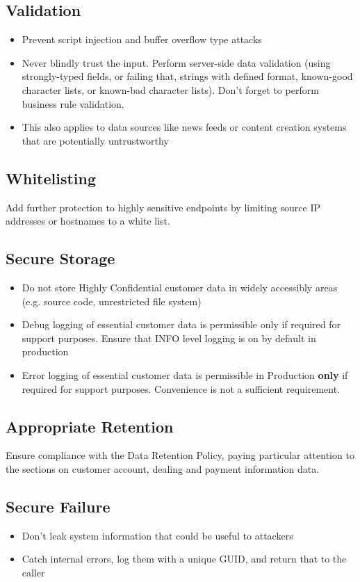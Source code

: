 \documentclass[a5paper,pagesize,10pt,bibtotoc,DIV=10,twoside]{scrbook}
\begin{document}
\subsection{Validation}
\begin{itemize}
\item Prevent script injection and buffer overflow type attacks
\item Never blindly trust the input. Perform server-side data validation (using strongly-typed fields, or failing that, strings with defined format, known-good character lists, or known-bad character lists). Don't forget to perform business rule validation.
\item This also applies to data sources like news feeds or content creation systems that are potentially untrustworthy
\end{itemize}

\subsection{Whitelisting}
Add further protection to highly sensitive endpoints by limiting source IP addresses or hostnames to a white list.

\subsection{Secure Storage}
\begin{itemize}
\item Do not store Highly Confidential customer data in widely accessibly areas (e.g. source code, unrestricted file system)
\item Debug logging of essential customer data is permissible only if required for support purposes.  Ensure that INFO level logging is on by default in production
\item Error logging of essential customer data is permissible in Production \textbf{only} if required for support purposes. Convenience is not a sufficient requirement.
\end{itemize}

\subsection{Appropriate Retention}
Ensure compliance with the Data Retention Policy, paying particular attention to the sections on customer account, dealing and payment information data.

\subsection{Secure Failure}
\begin{itemize}
\item Don't leak system information that could be useful to attackers
\item Catch internal errors, log them with a unique GUID, and return that to the caller
\end{itemize}
\end{document}
